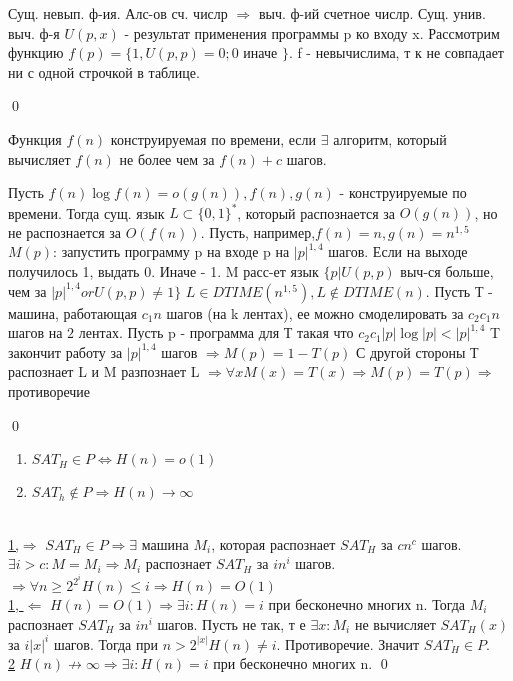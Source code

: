 \documentclass{article}
\begin{document}
 

	\begin{theorem}
		Сущ. невып. ф-ия.
		\proof
		Алс-ов сч. числр $\Rightarrow$ выч. ф-ий счетное числр. Сущ. унив. выч. ф-я $U(p,x)$ -  результат применения программы p ко входу x.
		Рассмотрим функцию $f(p) = \{1, U(p,p)=0; 0$ иначе $\}$. f - невычислима, т к не совпадает ни с одной строчкой в таблице.
	\end{theorem}
	\qed
	
	
	\begin{definition}
		Функция $f(n)$ конструируемая по времени, если $\exists$ алгоритм, который вычисляет $f(n)$ не более чем за $f(n) + c$ шагов.
	\end{definition}
	
	\begin{theorem}[<Об иерархии>]
		Пусть $f(n)\log f(n) = o(g(n)), f(n),g(n)$ - конструируемые по времени.  Тогда сущ. язык $L \subset \{0,1\}^*$,
		который распознается за $O(g(n))$, но не распознается за $O(f(n))$.
		\proof
		Пусть, например,$f(n) = n, g(n) = n^{1,5}$
		$M(p)$: запустить программу p на входе p на $|p|^{1,4}$ шагов. Если на выходе получилось 1, выдать 0. Иначе - 1.
		M расс-ет язык $\{p|U(p,p)$ выч-ся больше, чем за $|p|^{1,4} or U(p,p) \not = 1\}$
		$L \in DTIME(n^{1,5}), L \not \in DTIME(n)$.
		Пусть Т - машина, работающая $c_1 n$ шагов (на k лентах), ее можно смоделировать за $c_2c_1n$ шагов на $2$ лентах.
		Пусть p - программа для Т такая что $c_2 c_1 |p|\log |p| < |p|^{1,4}$
		T закончит работу за $|p|^{1,4}$ шагов $\Rightarrow M(p) = 1-T(p)$
		С другой стороны Т распознает L и M разпознает L $\Rightarrow \forall x M(x) = T(x) \Rightarrow M(p) = T(p) \Rightarrow$ противоречие
	\end{theorem}
	\qed
	
		\begin{statement}
			\begin{enumerate}
				\item $SAT_H \in P \Leftrightarrow H(n) = o(1)$
				\item $SAT_h \not\in P \Rightarrow H(n)\to\infty$
			\end{enumerate}
		\end{statement}
		\proof \\
		\underline{1,$\Rightarrow$} $SAT_H \in P \Rightarrow \exists$ машина $M_i$, которая распознает $SAT_H$ за $cn^c$ шагов.
		$\exists i >c : M=M_i \Rightarrow M_i$ распознает $SAT_H$ за $in^i$ шагов.$\Rightarrow \forall n \ge 2^{2^i} H(n) \le i \Rightarrow H(n) = O(1)$\\
		\underline{1, $\Leftarrow$} $H(n) = O(1) \Rightarrow \exists i: H(n) = i$ при бесконечно многих n. Тогда $M_i$ распознает $SAT_H$ за $in^i$  шагов.
		Пусть не так, т е $\exists x: M_i$ не вычисляет  $SAT_H(x)$  за $i|x|^i$ шагов.
		Тогда при  $n > 2^{|x|} H(n)\not = i$. Противоречие. Значит $SAT_H \in P.$\\
		\underline{2} $H(n) \not\to\infty \Rightarrow \exists i: H(n) =i$ при бесконечно многих n.
		\qed
	
\end{document}
